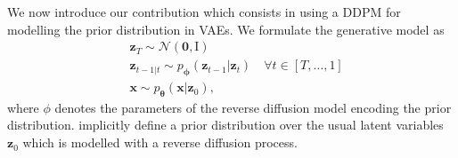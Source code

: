 We now introduce our contribution which consists in using a DDPM for modelling the prior distribution in VAEs.
We formulate the generative model as
\begin{align}
    & \mathbf{z}_T \sim \mathcal{N}(\mathbf{0}, \text{I}) \label{eq:VAE_DDPM_1} \\
    & \mathbf{z}_{t-1|t} \sim p_{\mathbf{\phi}}(\mathbf{z}_{t-1}|\mathbf{z}_{t})\quad \forall t \in \left[T, \dots, 1\right] \label{eq:VAE_DDPM_2} \\
    &\mathbf{x} \sim p_{\mathbf{\theta}}(\mathbf{x}|\mathbf{z}_0),
\end{align}
where $\phi$ denotes the parameters of the reverse diffusion model encoding the prior distribution.  implicitly define a prior distribution over the usual latent variables $\mathbf{z}_0$ which is modelled with a reverse diffusion process.

